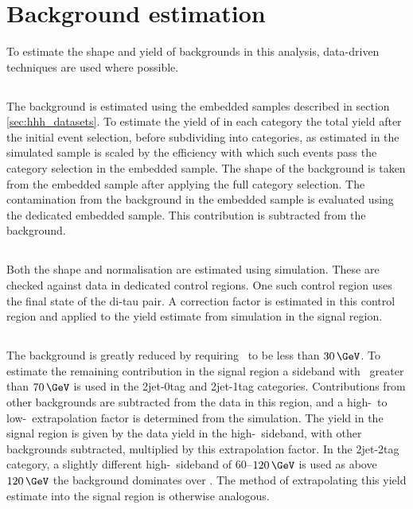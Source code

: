 \section{Background estimation}
\label{sec:hhh_backgrounds}
To estimate the shape and yield of backgrounds in this analysis, data-driven techniques are
used where possible. 
\subsection{\texorpdfstring{\Ztautau}{Z to tau tau}}
\label{sec:hhh_backgrounds_ztt}
The \Ztautau background is estimated using the embedded samples
described in section \ref{sec:hhh_datasets}. To estimate the 
yield of \Ztautau in each category the total
yield after the initial event selection, before subdividing into categories, as
estimated in the simulated \Ztautau sample is scaled by the efficiency with which 
such events pass the category selection in the embedded sample. The shape of
the \Ztautau background is taken from the embedded sample after applying the full
category selection. The contamination from the \ttbar background in the embedded
sample is evaluated using the dedicated \ttbar embedded sample. This contribution
is subtracted from the \Ztautau background.
\subsection{\texorpdfstring{\ttbar}{ttbar}}
Both the \ttbar shape and normalisation are estimated using simulation.
These are checked against data in dedicated control regions. One such control
region uses the \emu final state of the di-tau pair. A correction factor is estimated in 
this control region and applied to the yield estimate from simulation in the signal region. 
\subsection{\texorpdfstring{\Wjets}{W + jets}}
\label{sec:hhh_backgrounds_wjets}
The \Wjets background is greatly reduced by requiring \mT~to
be less than $30\,\GeV$. To estimate the remaining contribution
in the signal region a sideband with \mT~greater
than $70\,\GeV$ is used in the 2jet-0tag and 2jet-1tag categories.
Contributions from other backgrounds are subtracted 
from the data in this region, and a high-\mT~to \mbox{low-\mT}~extrapolation
 factor is determined from the \Wjets simulation.
The yield in the signal region is given by the data yield in the high-\mT~sideband, with
other backgrounds subtracted, multiplied by this extrapolation factor.
In the 2jet-2tag category, a slightly different high-\mT~sideband of $60$--$120\,\GeV$ is used 
as above $120\,\GeV$ the \ttbar background dominates over \Wjets. 
The method of extrapolating this yield estimate into
the signal region is otherwise analogous.

